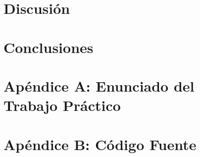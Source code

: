 \documentclass[a4paper,10pt,twoside]{article}
\begin{document}
\section{Discusión}




\section{Conclusiones}




\newpage

\section{Apéndice A: Enunciado del Trabajo Práctico}





\newpage

\section{Apéndice B: Código Fuente}









\end{document}
